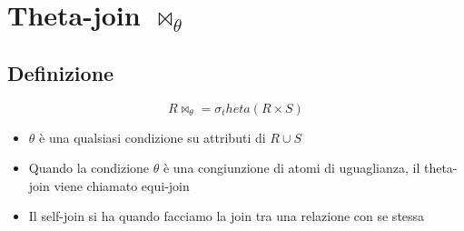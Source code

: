\section{Theta-join $\bowtie_\theta$}
\subsection{Definizione}
$$
R \bowtie_\theta = \sigma_theta(R \times S) 
$$
\begin{itemize}
    \item $\theta$ è una qualsiasi condizione su attributi di $R \cup S$
    \item Quando la condizione $\theta$ è una congiunzione di atomi di uguaglianza, il theta-join viene chiamato equi-join
    \item Il self-join si ha quando facciamo la join tra una relazione con se stessa
\end{itemize}

